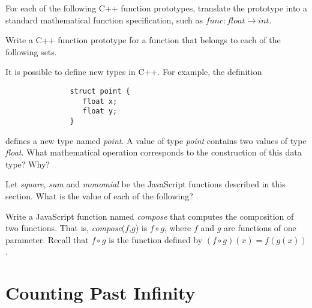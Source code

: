 \begin{exercises}

\problem For each of the following C++ function prototypes, translate the
prototype into a standard mathematical function specification, such
as $\textit{func}\colon\textit{float}\to\textit{int}$.

\problem Write a C++ function prototype for a function that
belongs to each of the following sets.

\smallskip


\problem It is possible to define new types in C++.  For example, the
definition
\begin{verbatim}
               struct point {
                  float x;
                  float y;
               }
\end{verbatim}
defines a new type named \textit{point}.  A value of type \textit{point}
contains two values of type \textit{float}.  What mathematical operation
corresponds to the construction of this data type?  Why?

\problem Let \textit{square}, \textit{sum} and \textit{monomial}
be the JavaScript functions described in this section.  What is the
value of each of the following?


\problem Write a JavaScript function named \textit{compose}
that computes the composition of two functions.  That
is, \textit{compose}($f$,$g$) is $f\circ g$, where
$f$ and $g$ are functions of one parameter.  Recall that
$f\circ g$ is the function defined by $(f\circ g)(x)=f(g(x))$.

\end{exercises}





\section{Counting Past Infinity}\label{S-sets-6}

